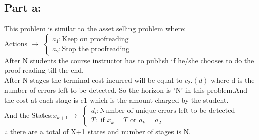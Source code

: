 \documentclass{article}
\begin{document}
\subsection{Part a:}
This problem is similar to the asset selling problem where:\\
Actions $\rightarrow $ 
$
\begin{cases}
  a_1: \textrm{Keep  on  proofreading}\\    
  a_2: \textrm{Stop the proofreading}    
\end{cases}
$\\
After N students the course instructor has to publish if he/she chooses to do the proof reading till the end.\\
After N stages the terminal cost incurred will be equal to $c_2.(d)$ where d is the number of errors left to be detected. So the horizon is 'N' in this problem.And the cost at each stage is c1 which is the amount charged by the student.\\
And the States:$x_{k+1} \rightarrow $ 
$
\begin{cases}
  d_i: \textrm{Number of unique errors left to be detected}\\    
  T: \textrm{ if } x_k =T \textrm{ or } a_k=a_2    
\end{cases}
$\\
$\therefore $ there are a total of X+1 states and number of stages is N.\\
\end{document}
